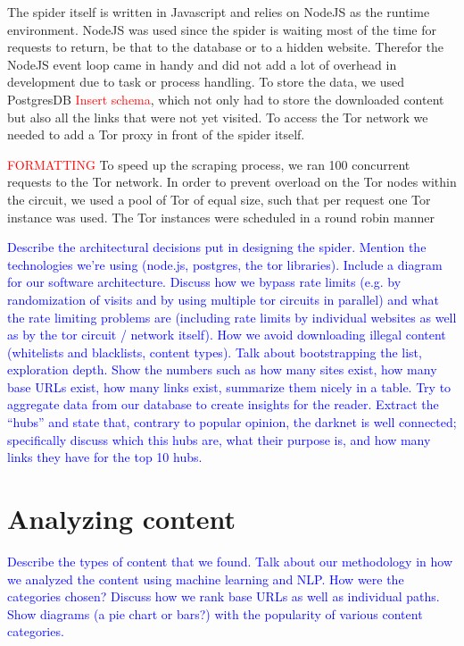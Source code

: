\documentclass[USenglish,oneside,twocolumn]{article}
\newcommand\TODO[1]{\textcolor{red}{#1}}
\newcommand\CONTENT[1]{\textcolor{blue}{#1}}
\begin{document}
The spider itself is written in Javascript and relies on NodeJS as the runtime environment. NodeJS was used since the spider is waiting most of the time for requests to return, be that to the database or to a hidden website. Therefor the NodeJS event loop came in handy and did not add a lot of overhead in development due to task or process handling. To store the data, we used PostgresDB \TODO{Insert schema}, which not only had to store the downloaded content but also all the links that were not yet visited.
To access the Tor network we needed to add a Tor proxy in front of the spider itself.

\TODO{FORMATTING}
To speed up the scraping process, we ran 100 concurrent requests to the Tor network. In order to prevent overload on the Tor nodes within the circuit, we used a pool of Tor of equal size, such that per request one Tor instance was used. The Tor instances were scheduled in a round robin manner 

\CONTENT{Describe the architectural decisions put in designing the spider. Mention the technologies we’re using (node.js, postgres, the tor libraries). Include a diagram for our software architecture. Discuss how we bypass rate limits (e.g. by randomization of visits and by using multiple tor circuits in parallel) and what the rate limiting problems are (including rate limits by individual websites as well as by the tor circuit / network itself). How we avoid downloading illegal content (whitelists and blacklists, content types). Talk about bootstrapping the list, exploration depth. Show the numbers such as how many sites exist, how many base URLs exist, how many links exist, summarize them nicely in a table. Try to aggregate data from our database to create insights for the reader. Extract the “hubs” and state that, contrary to popular opinion, the darknet is well connected; specifically discuss which this hubs are, what their purpose is, and how many links they have for the top 10 hubs.}

\section{Analyzing content}

\CONTENT{Describe the types of content that we found. Talk about our methodology in how we analyzed the content using machine learning and NLP. How were the categories chosen? Discuss how we rank base URLs as well as individual paths. Show diagrams (a pie chart or bars?) with the popularity of various content categories.}
\end{document}
